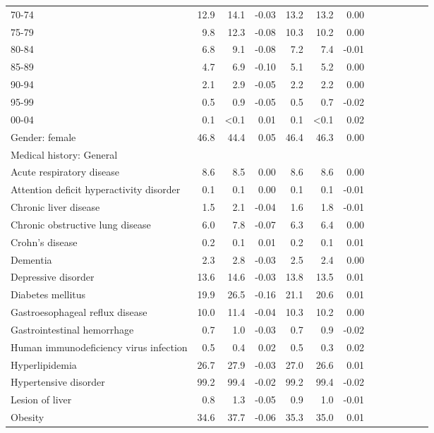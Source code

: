 \documentclass[11pt,]{article}
\begin{document}
\begin{longtable}{lrrrrrrrrrrrr}
      70-74 & 12.9 & 14.1 & -0.03 & 13.2 & 13.2 &  0.00 \\ 
      75-79 &  9.8 & 12.3 & -0.08 & 10.3 & 10.2 &  0.00 \\ 
      80-84 &  6.8 &  9.1 & -0.08 &  7.2 &  7.4 & -0.01 \\ 
      85-89 &  4.7 &  6.9 & -0.10 &  5.1 &  5.2 &  0.00 \\ 
      90-94 &  2.1 &  2.9 & -0.05 &  2.2 &  2.2 &  0.00 \\ 
      95-99 &  0.5 &  0.9 & -0.05 &  0.5 &  0.7 & -0.02 \\ 
      00-04 &  0.1 & <0.1 &  0.01 &  0.1 & <0.1 &  0.02 \\ 
  Gender: female & 46.8 & 44.4 &  0.05 & 46.4 & 46.3 &  0.00 \\ 
  Medical history: General &    &    &     &    &    &     \\ 
      Acute respiratory disease &  8.6 &  8.5 &  0.00 &  8.6 &  8.6 &  0.00 \\ 
      Attention deficit hyperactivity disorder &  0.1 &  0.1 &  0.00 &  0.1 &  0.1 & -0.01 \\ 
      Chronic liver disease &  1.5 &  2.1 & -0.04 &  1.6 &  1.8 & -0.01 \\ 
      Chronic obstructive lung disease &  6.0 &  7.8 & -0.07 &  6.3 &  6.4 &  0.00 \\ 
      Crohn's disease &  0.2 &  0.1 &  0.01 &  0.2 &  0.1 &  0.01 \\ 
      Dementia &  2.3 &  2.8 & -0.03 &  2.5 &  2.4 &  0.00 \\ 
      Depressive disorder & 13.6 & 14.6 & -0.03 & 13.8 & 13.5 &  0.01 \\ 
      Diabetes mellitus & 19.9 & 26.5 & -0.16 & 21.1 & 20.6 &  0.01 \\ 
      Gastroesophageal reflux disease & 10.0 & 11.4 & -0.04 & 10.3 & 10.2 &  0.00 \\ 
      Gastrointestinal hemorrhage &  0.7 &  1.0 & -0.03 &  0.7 &  0.9 & -0.02 \\ 
      Human immunodeficiency virus infection &  0.5 &  0.4 &  0.02 &  0.5 &  0.3 &  0.02 \\ 
      Hyperlipidemia & 26.7 & 27.9 & -0.03 & 27.0 & 26.6 &  0.01 \\ 
      Hypertensive disorder & 99.2 & 99.4 & -0.02 & 99.2 & 99.4 & -0.02 \\ 
      Lesion of liver &  0.8 &  1.3 & -0.05 &  0.9 &  1.0 & -0.01 \\ 
      Obesity & 34.6 & 37.7 & -0.06 & 35.3 & 35.0 &  0.01 \\ 

\end{longtable}
\end{document}
